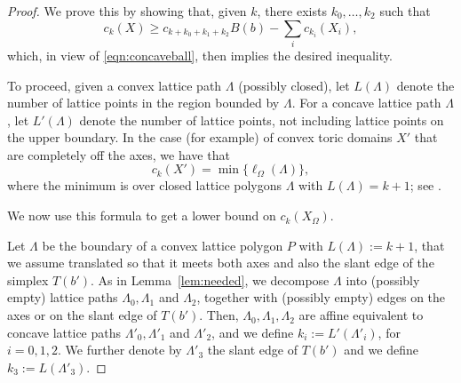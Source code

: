 \documentclass[11pt, reqno]{amsart}
\theoremstyle{remark}
\numberwithin{equation}{subsection}
\numberwithin{figure}{section}
\theoremstyle{customremark}
\newcommand{\La}{{\Lambda}}
\begin{document}
\begin{proof}
  We  prove  this by showing that, given $k$, there exists $k_0, \ldots, k_2$ such that
\begin{equation}
\label{eqn:other}
c_k(X) \ge c_{k + k_0+k_1 + k_2} B(b) - \sum_i c_{k_i}(X_i),
\end{equation}
which,  in view of \eqref{eqn:concaveball}, then implies the desired inequality.

To proceed, given a convex lattice path $\Lambda$ (possibly closed), let $L(\Lambda)$ denote the number of lattice points in the region bounded by $\Lambda$.  For a concave lattice path $\Lambda$, let $L'(\Lambda)$ denote the number of lattice points, not including lattice points on the upper boundary.  In the case (for example) of convex toric domains $X'$ that are completely off the axes, we have that
\begin{equation}
\label{eqn:formula}
c_k(X') =\min \lbrace \ell_{\Omega}(\Lambda) \rbrace,
\end{equation}
where the minimum is over closed lattice polygons $\Lambda$ with $L(\Lambda) = k + 1$; see \cite[Thm. 1.11]{Hutchq}.

We now use this formula to get a lower bound on $c_k(X_{\Omega})$.  

Let $\Lambda$ be the boundary of a convex lattice polygon $P$ with $L(\Lambda) := k+1$, that we assume translated so that it meets both axes and also the slant edge of the simplex $T(b')$.
  As in Lemma~\ref{lem:needed}, we decompose $\Lambda$ into (possibly empty) lattice paths $\Lambda_0, \Lambda_1$ and $\Lambda_2$, together with (possibly empty) edges on the axes or on the slant edge of  $T(b')$.
Then, $\Lambda_0, \La_1, \Lambda_2$ are affine equivalent to concave lattice paths $\Lambda'_0, \Lambda'_1$ and $\Lambda'_2$, and we define $k_i := L'(\Lambda'_i)$, for  $i=0,1,2$. We further denote by
 $\Lambda'_3$  the  slant edge of $T(b')$ 
 and we define $k_3 := L(\Lambda'_3)$.  



\end{proof}
\end{document}
